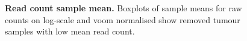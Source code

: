 \begin{figure}[!htp]
\begin{mdframed}
         \begin{center}
%
%
    \end{center}
  \caption[Read count sample mean]{\small \textbf{Read count sample mean.} Boxplots of sample means for raw counts on log-scale and voom normalised show removed tumour samples with low mean read count.}
\label{fig:boxplot}
\end{mdframed}
\end{figure}


